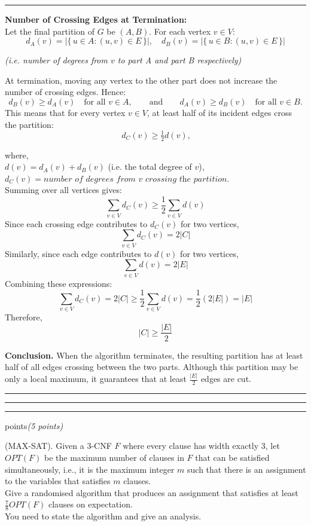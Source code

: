 \documentclass[11pt, english]{article}
\newcounter{questionnum}
\newenvironment{question}[1][]{%
  \stepcounter{questionnum}%
  \par\noindent{\Large\bfseries Question \thequestionnum}%
  \ifx#1\empty\else\hfill{\normalsize\itshape(#1)}\fi%
  \par\vspace{0.25\baselineskip}\noindent\ignorespaces
}{%
  \par\vspace{1\baselineskip}%
}
\newenvironment{answer}{%
  \par\noindent\hrule %
  \vspace{0.25\baselineskip}%
  \noindent{\Large\bfseries Answer}\par\vspace{0.25\baselineskip}\noindent\ignorespaces
}{%
  \par\vspace{0.5\baselineskip}%
  \noindent\hrule\vspace{0.5\baselineskip}%
  \hrule\hrule
}
\begin{document}
\begin{answer}
\noindent\textbf{Number of Crossing Edges at Termination:} \\[0.5em]
Let the final partition of $G$ be $(A, B)$.  
For each vertex $v \in V$:
\[
d_A(v) = |\{\, u \in A : (u,v) \in E \,\}|, \quad
d_B(v) = |\{\, u \in B : (u,v) \in E \,\}|
\]

{%
\centering
\textit{(i.e. number of degrees from $v$ to part A and part B respectively)}\par
}

\vspace{1em}

\noindent At termination, moving any vertex to the other part does not increase the number of crossing edges.  
Hence:
\[
d_B(v) \ge d_A(v) \quad \text{for all } v \in A, 
\qquad \text{and} \qquad
d_A(v) \ge d_B(v) \quad \text{for all } v \in B.
\]
This means that for every vertex $v \in V$, at least half of its incident edges cross the partition:
\[
\ d_C(v) \ge \tfrac{1}{2} d(v),
\]

where,\\
\indent$d(v) = d_A(v) + d_B(v)$ (i.e. the total degree of $v$),\\
\indent$d_C(v) = \textit{number of degrees from $v$ crossing the partition}$.\\

\medskip
\noindent Summing over all vertices gives:
\[
\sum_{v \in V} d_C(v) \ge \frac{1}{2} \sum_{v \in V} d(v)
\]
Since each crossing edge contributes to $d_C(v)$ for two vertices,
\[
\sum_{v \in V} d_C(v) = 2|C|
\]
Similarly, since each edge contributes to $d(v)$ for two vertices,
\[
\sum_{v \in V} d(v) = 2|E|
\]
Combining these expressions:
\[
\sum_{v \in V} d_C(v) =2|C| \ge \frac{1}{2} \sum_{v \in V} d(v) = \frac{1}{2} (2|E|) = |E|
\]
Therefore,
\[
|C| \ge \frac{|E|}{2}
\]

\medskip
\noindent
\textbf{Conclusion.}  
When the algorithm terminates, the resulting partition has at least half of all edges crossing between the two parts.  
Although this partition may be only a local maximum, it guarantees that at least $\tfrac{|E|}{2}$ edges are cut.
\end{answer}
\vspace{1em}
\begin{question}[5 points]
(MAX-SAT). Given a 3-CNF $F$ where every clause has width exactly 3, 
let $OPT(F)$ be the maximum number of clauses in $F$ that can be satisfied 
simultaneously, i.e., it is the maximum integer $m$ such that there is an 
assignment to the variables that satisfies $m$ clauses. \\
Give a randomised algorithm that produces an assignment that satisfies 
at least $\frac{7}{8} OPT(F)$ clauses on expectation. \\
You need to state the algorithm and give an analysis.
\end{question}
\end{document}

